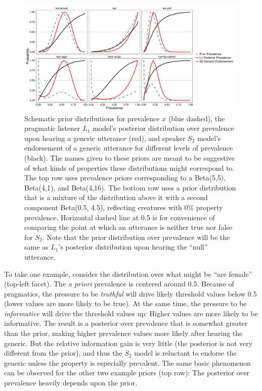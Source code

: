 \documentclass[12pt,letterpaper]{article}
\begin{document}
\begin{figure}
\centering
    \includegraphics[width=\columnwidth]{schematics_s2.pdf}
    \caption{Schematic prior distributions for prevalence $x$ (blue dashed), the pragmatic listener $L_1$ model's posterior distribution over prevalence upon hearing a generic utterance (red), and speaker $S_2$ model's endorsement of a generic utterance for different levels of prevalence (black).
    The names given to these priors are meant to be suggestive of what kinds of properties these distributions might correspond to.
    The top row uses prevalence priors corresponding to a Beta(5,5), Beta(4,1), and Beta(4,16).
      The bottom row uses a prior distribution that is a mixture of the distribution above it with a second component Beta(0.5, 4.5), reflecting creatures with 0\% property prevalence.
    Horizontal dashed line at 0.5 is for convenience of comparing the point at which an utterance is neither true nor false for $S_2$.
	Note that the prior distribution over prevalence will be the same as $L_1$'s posterior distribution upon hearing the ``null'' utterance.
    }
  \label{fig:schematic-unif}
\end{figure}


To take one example, consider the distribution over what might be ``are female'' (top-left facet).
The \emph{a priori} prevalence is centered around 0.5.
Because of pragmatics, the pressure to be \emph{truthful} will drive likely threshold values below 0.5 (lower values are more likely to be true). 
At the same time, the pressure to be \emph{informative} will drive the threshold values up: Higher values are more likely to be informative. 
The result is a posterior over prevalence that is somewhat greater than the prior, making higher prevalence values more likely after hearing the generic. 
But the relative information gain is very little (the posterior is not very different from the prior), and thus the $S_2$ model is reluctant to endorse the generic unless the property is especially prevalent. 
The same basic phenomenon can be observed for the other two example priors (top row): The posterior over prevalence heavily depends upon the prior. %
\end{document}
